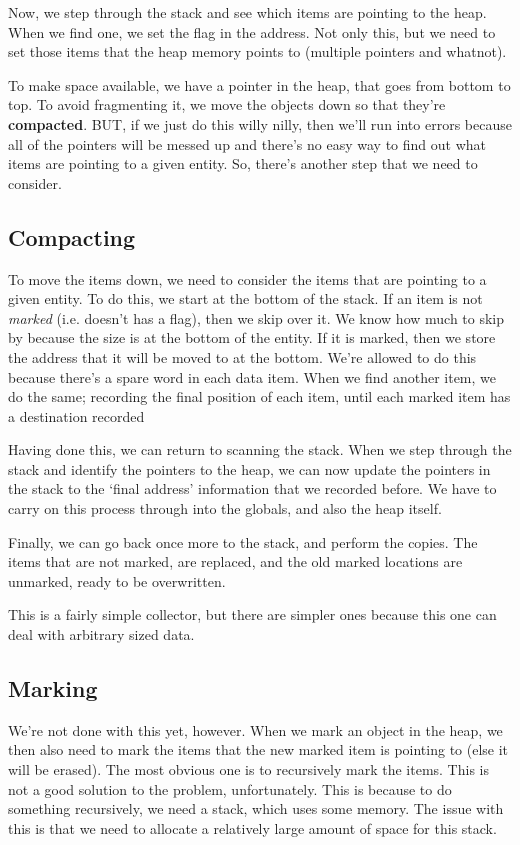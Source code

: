 \documentclass[11pt,a4paper,titlepage,dvipsnames,cmyk]{scrartcl}
\begin{document}
Now, we step through the stack and see which items are pointing to the
heap. When we find one, we set the flag in the address. Not only this, but
we need to set those items that the heap memory points to (multiple
pointers and whatnot).

To make space available, we have a pointer in the heap, that goes from
bottom to top. To avoid fragmenting it, we move the objects down so that
they're \textbf{compacted}. BUT, if we just do this willy nilly, then
we'll run into errors because all of the pointers will be messed up and
there's no easy way to find out what items are pointing to a given entity.
So, there's another step that we need to consider.

\subsection{Compacting}%
\label{sub:Compacting}
To move the items down, we need to consider the items that are pointing to
a given entity. To do this, we start at the bottom of the stack. If an
item is not \textit{marked} (i.e. doesn't has a flag), then we skip over
it. We know how much to skip by because the size is at the bottom of the
entity. If it is marked, then we store the address that it will be moved to
at the bottom. We're allowed to do this because there's a spare word in
each data item. When we find another item, we do the same; recording the
final position of each item, until each marked item has a destination
recorded

Having done this, we can return to scanning the stack. When we step
through the stack and identify the pointers to the heap, we can now update
the pointers in the stack to the `final address' information that we
recorded before. We have to carry on this process through into the
globals, and also the heap itself.

Finally, we can go back once more to the stack, and perform the copies.
The items that are not marked, are replaced, and the old marked locations
are unmarked, ready to be overwritten.

This is a fairly simple collector, but there are simpler ones because this
one can deal with arbitrary sized data.

\subsection{Marking}%
\label{sub:Marked pointers?}
We're not done with this yet, however. When we mark an object in the heap,
we then also need to mark the items that the new marked item is pointing
to (else it will be erased). The most obvious one is to recursively mark
the items. This is not a good solution to the problem, unfortunately. This
is because to do something recursively, we need a stack, which uses some
memory. The issue with this is that we need to allocate a relatively large
amount of space for this stack.
\end{document}
